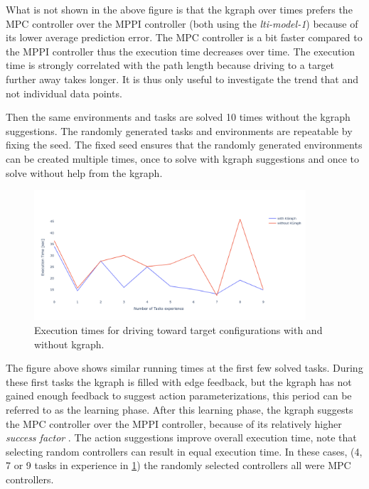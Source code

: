 What is not shown in the above figure is that the \ac{kgraph} over times prefers the \ac{MPC} controller over the \ac{MPPI} controller (both using the \textit{lti-model-1}) because of its lower average prediction error. The \ac{MPC} controller is a bit faster compared to the \ac{MPPI} controller thus the execution time decreases over time. The execution time is strongly correlated with the path length because driving to a target further away takes longer. It is thus only useful to investigate the trend that  and not individual data points.\bs

Then the same environments and tasks are solved 10 times without the \ac{kgraph} suggestions. The randomly generated tasks and environments are repeatable by fixing the seed. The fixed seed ensures that the randomly generated environments can be created multiple times, once to solve with \ac{kgraph} suggestions and once to solve without help from the \ac{kgraph}.\bs

\begin{figure}[H]
    \centering
    \includegraphics[width=0.9\textwidth]{figures/results/random_drive_with_without_kgraph}
    \caption{Execution times for driving toward target configurations with and without \ac{kgraph}.}%
    \label{fig:results_random_drive_task}
\end{figure}

The figure above shows similar running times at the first few solved tasks. During these first tasks the \ac{kgraph} is filled with edge feedback, but the \ac{kgraph} has not gained enough feedback to suggest action parameterizations, this period can be referred to as the learning phase. After this learning phase, the \ac{kgraph} suggests the \ac{MPC} controller over the \ac{MPPI} controller, because of its relatively higher \textit{success factor} . The action suggestions improve overall execution time, note that selecting random controllers can result in equal execution time. In these cases, (4, 7 or 9 tasks in experience in \cref{fig:results_random_drive_task}) the randomly selected controllers all were \ac{MPC} controllers.\bs

